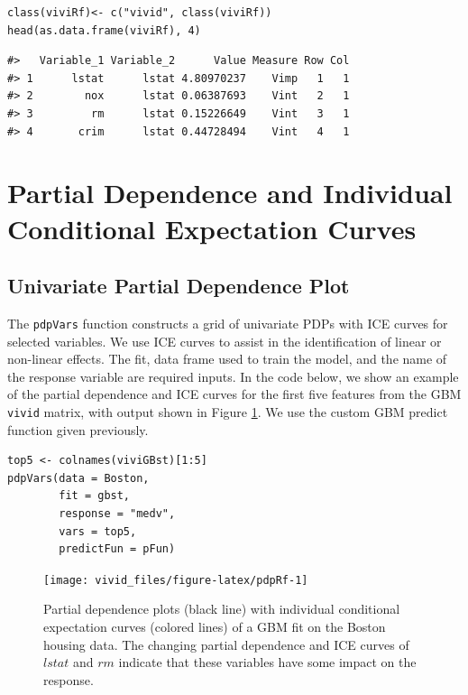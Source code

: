 \begin{verbatim}
class(viviRf)<- c("vivid", class(viviRf)) 
head(as.data.frame(viviRf), 4)
\end{verbatim}

\begin{verbatim}
#>   Variable_1 Variable_2      Value Measure Row Col
#> 1      lstat      lstat 4.80970237    Vimp   1   1
#> 2        nox      lstat 0.06387693    Vint   2   1
#> 3         rm      lstat 0.15226649    Vint   3   1
#> 4       crim      lstat 0.44728494    Vint   4   1
\end{verbatim}

\hypertarget{GPDP}{%
\section{Partial Dependence and Individual Conditional Expectation Curves}\label{GPDP}}

\hypertarget{univariate-partial-dependence-plot}{%
\subsection{Univariate Partial Dependence Plot}\label{univariate-partial-dependence-plot}}

The \texttt{pdpVars} function constructs a grid of univariate PDPs with ICE curves for selected variables. We use ICE curves to assist in the identification of linear or non-linear effects. The fit, data frame used to train the model, and the name of the response variable are required inputs. In the code below, we show an example of the partial dependence and ICE curves for the first five features from the GBM \texttt{vivid} matrix, with output shown in Figure \ref{fig:pdpRf}. We use the custom GBM predict function given previously.

\begin{verbatim}
top5 <- colnames(viviGBst)[1:5]
pdpVars(data = Boston,
        fit = gbst,
        response = "medv",
        vars = top5,
        predictFun = pFun)
\end{verbatim}

\begin{figure}

{\centering \texttt{[image: vivid\_files/figure-latex/pdpRf-1]} 

}

\caption{Partial dependence plots (black line) with individual conditional expectation curves (colored lines) of a GBM fit on the Boston housing data. The changing partial dependence and ICE curves of $lstat$ and $rm$ indicate that these variables have some impact on the response.}\label{fig:pdpRf}
\end{figure}

